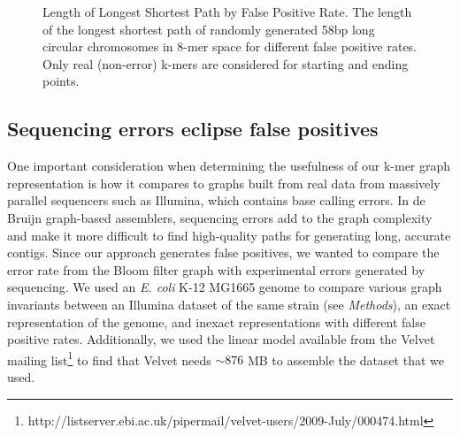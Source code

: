 \documentclass[12pt]{article} \usepackage{simplemargins}
\begin{document}
\begin{figure}
\caption{Length of Longest Shortest Path by False Positive Rate. The 
length of the longest shortest path of randomly generated 58bp 
long circular chromosomes in 8-mer 
space for different false positive rates. Only real (non-error) k-mers are
considered for starting and ending points.}
\end{figure}

\subsection{Sequencing errors eclipse false positives}
One important consideration when determining the usefulness of our
k-mer graph representation is how it compares to graphs built from
real data from massively parallel sequencers such as Illumina, which
contains base calling errors.  In de Bruijn graph-based assemblers,
sequencing errors add to the graph complexity and make it more
difficult to find high-quality paths for generating long, accurate
contigs. Since our approach generates false positives, we wanted to
compare the error rate from the Bloom filter graph with experimental
errors generated by sequencing. We used an
\emph{E. coli} K-12 MG1665 genome to compare various graph invariants
between an Illumina dataset of the same strain (see \emph{Methods}),
an exact representation of the genome, and inexact representations
with different false positive rates. Additionally, we used the linear 
model available 
from the Velvet mailing list\footnote{http://listserver.ebi.ac.uk/pipermail/velvet-users/2009-July/000474.html} to find that Velvet needs $\sim 876$ MB 
to assemble the dataset that we used.
\end{document}
